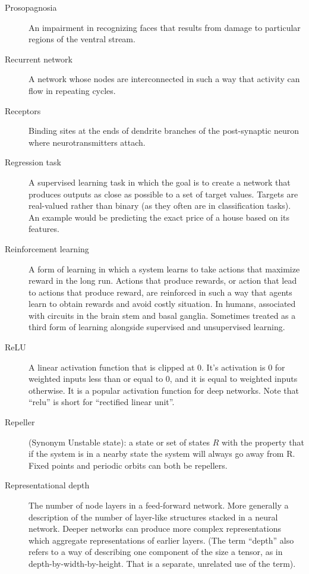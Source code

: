 \begin{description}
\item[Prosopagnosia] An impairment in recognizing faces that results from damage to particular regions of the ventral stream.


\item[Recurrent network] A network whose nodes are interconnected in such a way that activity can flow in repeating cycles.

\item[Receptors] Binding sites at the ends of dendrite branches of the post-synaptic neuron where neurotransmitters attach.


\item[Regression task] A supervised learning task in which the goal is to create a network that produces outputs as close as possible to a set of target values. Targets are real-valued rather than binary (as they often are in classification tasks). An example would be predicting the exact price of a house based on its features.

\item[Reinforcement learning] A form of learning in which a system learns to take actions that maximize reward in the long run.   Actions that produce rewards, or action that lead to actions that produce reward, are reinforced in such a way that agents learn to obtain rewards and avoid costly situation.  In humans, associated with circuits in the brain stem and basal ganglia.  Sometimes treated as a third form of learning alongside supervised and unsupervised learning.

\item[ReLU] A linear activation function that is clipped at  0. It's activation is 0 for weighted inputs less than or equal to 0, and it is equal to weighted inputs otherwise. It is a popular activation function for deep networks. Note that ``relu'' is short for ``rectified linear unit''.

\item[Repeller] (Synonym Unstable state): a state or set of states $R$ with the property that if the system is in a nearby state the system will always go away from R. Fixed points and periodic orbits can both be repellers.

\item[Representational depth] The number of node layers in a feed-forward network. More generally a description of the number of  layer-like structures stacked in a neural network. Deeper networks can produce more complex representations which aggregate representations of earlier layers. (The term ``depth'' also refers to a way of describing one component of the size a tensor, as in depth-by-width-by-height. That is a separate, unrelated use of the term).
 

\end{description}
